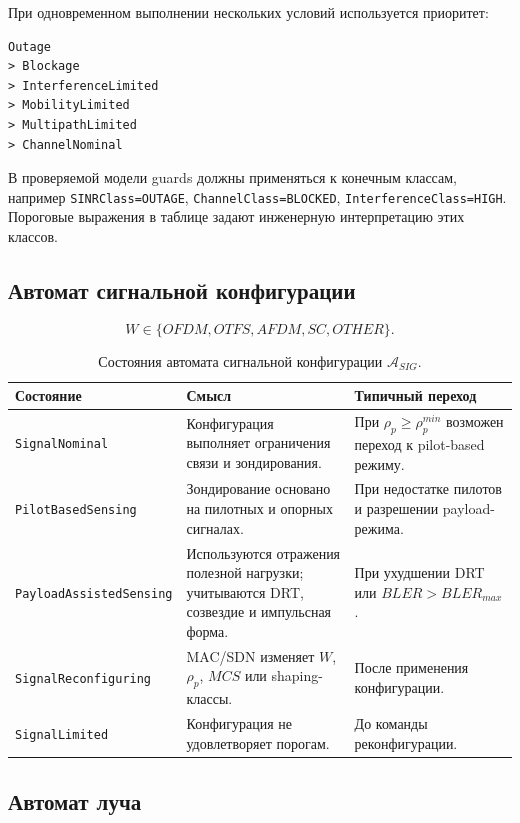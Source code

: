 \documentclass[12pt,a4paper]{article}
\begin{document}
При одновременном выполнении нескольких условий используется приоритет:

\begin{verbatim}
Outage
> Blockage
> InterferenceLimited
> MobilityLimited
> MultipathLimited
> ChannelNominal
\end{verbatim}

В проверяемой модели guards должны применяться к конечным классам, например \texttt{SINRClass=OUTAGE}, \texttt{ChannelClass=BLOCKED}, \texttt{InterferenceClass=HIGH}. Пороговые выражения в таблице задают инженерную интерпретацию этих классов.

\subsection{Автомат сигнальной конфигурации}

\begin{equation}
W\in\{OFDM,OTFS,AFDM,SC,OTHER\}.
\end{equation}

\begin{table}[htbp]
\centering
\small
\setlength{\tabcolsep}{4pt}
\begin{tabularx}{\textwidth}{p{}YY}
\toprule
Состояние & Смысл & Типичный переход \\
\midrule
\texttt{SignalNominal} & Конфигурация выполняет ограничения связи и зондирования. & При $\rho_p\ge\rho_p^{min}$ возможен переход к pilot-based режиму. \\
\texttt{PilotBasedSensing} & Зондирование основано на пилотных и опорных сигналах. & При недостатке пилотов и разрешении payload-режима. \\
\texttt{PayloadAssistedSensing} & Используются отражения полезной нагрузки; учитываются DRT, созвездие и импульсная форма. & При ухудшении DRT или $BLER>BLER_{max}$. \\
\texttt{SignalReconfiguring} & MAC/SDN изменяет $W$, $\rho_p$, $MCS$ или shaping-классы. & После применения конфигурации. \\
\texttt{SignalLimited} & Конфигурация не удовлетворяет порогам. & До команды реконфигурации. \\
\bottomrule
\end{tabularx}
\caption{Состояния автомата сигнальной конфигурации $\mathcal{A}_{SIG}$.}
\label{tab:sig_states}
\end{table}

\subsection{Автомат луча}
\end{document}

